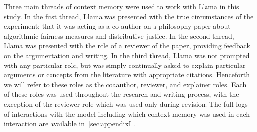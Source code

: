 Three main threads of context memory were used to work with Llama in this study.
In the first thread, Llama was presented with the true circumstances of the
experiment: that it was acting as a co-author on a philosophy paper about
algorithmic fairness measures and distributive justice. In the second thread,
Llama was presented with the role of a reviewer of the paper, providing feedback
on the argumentation and writing. In the third thread, Llama was not prompted
with any particular role, but was simply continually asked to explain particular
arguments or concepts from the literature with appropriate citations. Henceforth
we will refer to these roles as the coaauthor, reviewer, and explainer roles. 
Each of these roles was used throughout the research and writing process, with
the exception of the reviewer role which was used only during revision. The full
logs of interactions with the model including which context memory was used in
each interaction are available in~\ref{sec:appendixI}.
